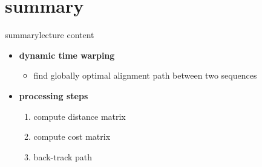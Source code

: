     \section{summary}
        \begin{frame}{summary}{lecture content}
            \begin{itemize}
                \item   \textbf{dynamic time warping}
                    \begin{itemize}
                        \item   find globally optimal alignment path between two sequences
                    \end{itemize}
                \bigskip
                \item   \textbf{processing steps}
                    \begin{enumerate}
                        \item   compute distance matrix
                        \item   compute cost matrix
                        \item   back-track path
                    \end{enumerate}
            \end{itemize}
        \end{frame}

